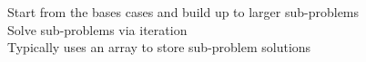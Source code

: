 \documentclass[preview]{standalone}
\begin{document}
Start from the bases cases and build up to larger sub-problems\\Solve sub-problems via iteration\\Typically uses an array to store sub-problem solutions\\
\end{document}
